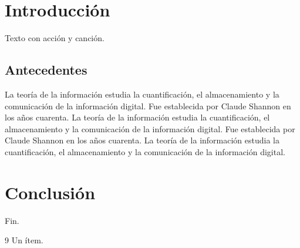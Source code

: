 \documentclass{report}
\begin{document}
\tableofcontents
\chapter{Introducción}
Texto con acción y canción.
\section{Antecedentes}
La teoría de la información estudia la cuantificación, el almacenamiento y la comunicación de la información digital. Fue establecida por Claude Shannon en los años cuarenta. La teoría de la información estudia la cuantificación, el almacenamiento y la comunicación de la información digital. Fue establecida por Claude Shannon en los años cuarenta. La teoría de la información estudia la cuantificación, el almacenamiento y la comunicación de la información digital.
\chapter{Conclusión}
Fin.
\begin{thebibliography}{9}
 Un ítem.
\end{thebibliography}
\end{document}

